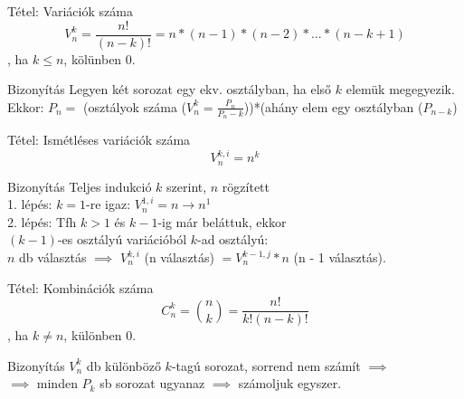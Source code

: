 \documentclass{beamer}
\begin{document}
\begin{frame}

\begin{block}{Tétel: Variációk száma}
$$V_n^k = \frac{n!}{(n - k)!} = n * (n - 1) * (n - 2) * ... * (n - k + 1)$$, ha $k \leq n$, kölünben 0.

\end{block}

\begin{block}{Bizonyítás}
Legyen két sorozat egy ekv. osztályban, ha első $k$ elemük megegyezik.\\
Ekkor: $P_n = $ (osztályok száma ($V_n^k = \frac{P_n}{P_n - k}$))*(ahány elem egy osztályban ($P_{n - k}$)


\end{block}

\end{frame}

\begin{frame}

\begin{block}{Tétel: Ismétléses variációk száma}
$$V_n^{k, i} = n^k$$

\end{block}

\begin{block}{Bizonyítás}
Teljes indukció $k$ szerint, $n$ rögzített\\
1. lépés: $k = 1$-re igaz: $V_n^{1, i} = n \rightarrow n^1$\\
2. lépés: Tfh $k > 1$ és $k - 1$-ig már beláttuk, ekkor\\
$(k - 1)$-es osztályú variációból $k$-ad osztályú:\\
$n$ db választás $\implies$ $V_n^{k, i}$ (n választás) $= V_n^{k - 1, j} * n$ (n - 1 választás).

\end{block}

\end{frame}

\begin{frame}

\begin{block}{Tétel: Kombinációk száma}
$$C_n^k = {{n}\choose{k}} = \frac{n!}{k!(n - k)!} $$, ha $k \neq n$, különben 0.

\end{block}

\begin{block}{Bizonyítás}
$V_n^k$ db különböző $k$-tagú sorozat, sorrend nem számít $\implies$\\
$\implies$ minden $P_k$ sb sorozat ugyanaz $\implies$ számoljuk egyszer.\\

\end{block}

\end{frame}
\end{document}

